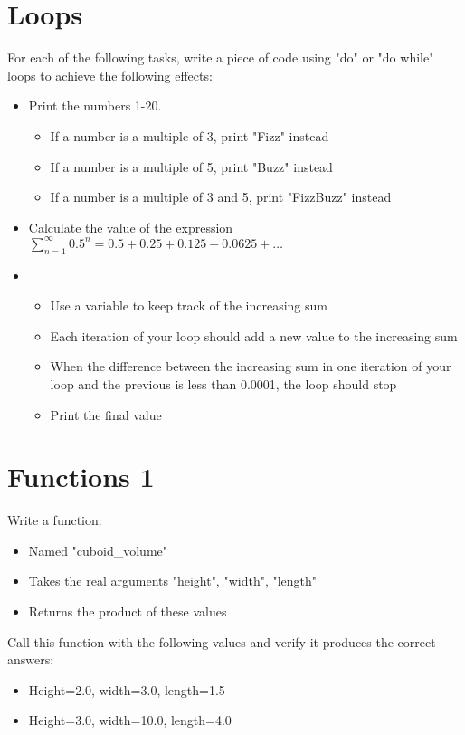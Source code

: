\documentclass[11pt,a4paper]{article}
\begin{document}
\section{Loops}
For each of the following tasks, write a piece of code using "do" or "do while" loops to achieve the following effects:
\begin{itemize}
    \item Print the numbers 1-20.
    \begin{itemize}
        \item If a number is a multiple of 3, print "Fizz" instead
        \item If a number is a multiple of 5, print "Buzz" instead
        \item If a number is a multiple of 3 and 5, print "FizzBuzz" instead
    \end{itemize}
    \item Calculate the value of the expression $\sum\limits_{n=1}^{\infty}0.5^{n} = 0.5+0.25+0.125+0.0625+\hdots$
    \item \begin{itemize}
        \item Use a variable to keep track of the increasing sum
        \item Each iteration of your loop should add a new value to the increasing sum
        \item When the difference between the increasing sum in one iteration of your loop and the previous is less than 0.0001, the loop should stop
        \item Print the final value
    \end{itemize}
\end{itemize}




\section{Functions 1}
Write a function:
\begin{itemize}
    \item Named "cuboid\_volume"
    \item Takes the real arguments "height", "width", "length"
    \item Returns the product of these values
\end {itemize}
Call this function with the following values and verify it produces the correct answers:
\begin{itemize}
    \item Height=2.0, width=3.0, length=1.5
    \item Height=3.0, width=10.0, length=4.0
\end {itemize}
\end{document}
